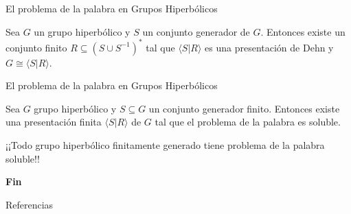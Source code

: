\documentclass[xcolor=dvipsnames]{beamer}
\theoremstyle{largebreak}
\newcommand{\gen}[1]{\ensuremath{\langle#1\rangle}}
\begin{document}
\begin{frame}{El problema de la palabra en Grupos Hiperbólicos}
    \begin{theor}
        Sea $G$ un grupo hiperbólico y $S$ un conjunto generador de $G$. Entonces existe un conjunto finito $R\subseteq(S\cup S^{-1})^*$ tal que $\gen{S|R}$ es una presentación de Dehn y $G\cong\gen{S|R}$.
    \end{theor}
\end{frame}

\begin{frame}{El problema de la palabra en Grupos Hiperbólicos}
    \begin{cor}
        Sea $G$ grupo hiperbólico y $S\subseteq G$ un conjunto generador finito. Entonces existe una presentación finita $\gen{S|R}$ de $G$ tal que el problema de la palabra es soluble.
    \end{cor}

    \pause

    \begin{center}
        ¡¡Todo grupo hiperbólico finitamente generado tiene problema de la palabra soluble!!
    \end{center}
\end{frame}


\begin{frame}
    \Huge{\centerline{\textbf{Fin}}}
\end{frame}

\begin{frame}{Referencias}
    \footnotesize
    
    
\end{frame}
\end{document}
